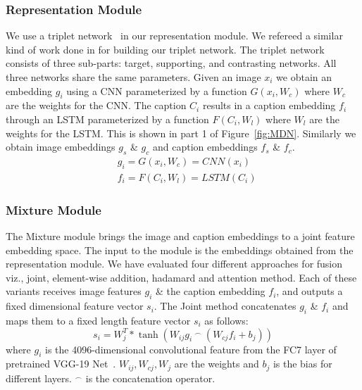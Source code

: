 \documentclass[11pt,a4paper]{article}
\begin{document}
\subsubsection{Representation Module}
We use a triplet network~\cite{Frome_ICCV2007,Hoffer_Springer2015} in our representation module. 
We refereed a similar kind of work done in \cite{Patro_CVPR2018} for building our triplet network. The triplet network consists of three sub-parts: target, supporting, and contrasting networks. All three networks share the same parameters. Given an image $x_i$ we obtain an embedding $g_i$ using a CNN parameterized by a function $G(x_i,W_c)$ where $W_c$ are the weights for the CNN. The caption $C_i$ results in a caption embedding $f_i$ through an LSTM parameterized by a function $F(C_i, W_l)$ where $W_l$ are the weights for the LSTM. This is shown in part 1 of Figure~\ref{fig:MDN}. Similarly we obtain image embeddings $g_s$ \& $g_c$  and  caption embeddings $f_s$ \& $f_c$.  
\begin{equation}
 \begin{split}
&g_i=G(x_i,W_c)=CNN(x_i)\\
&f_i=F(C_i, W_l)=LSTM(C_i)
\end{split}
\end{equation}

\subsubsection{Mixture Module}\label{mixture_model}
The Mixture module brings the image and caption embeddings to a joint feature embedding space. The input to the module is the embeddings obtained from the representation module. We have evaluated four different approaches for fusion viz., joint, element-wise addition, hadamard and attention method. Each of these variants receives image features $g_i$ \& the caption embedding $f_i$, and outputs a fixed dimensional feature vector $s_i$.  
The Joint method concatenates $g_{i}$  \& $f_{i}$ and maps them to a fixed length feature vector $s_{i}$ as follows:
\begin{equation}
     s_{i} =  W^{T}_{j} *  \tanh(  W_{ij}  g_{i} \ ^\frown \ (W_{cj}  f_{i} + b_j))
\end{equation}
where $g_{i}$ is  the 4096-dimensional  convolutional feature from the  FC7 layer of pretrained VGG-19 Net~\cite{simonyan_arXiv2014}. $W_{ij}, W_{cj},W_{j}$ are the weights and $b_j$ is the bias for different layers. $^\frown$ is the concatenation operator. 
\end{document}
